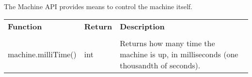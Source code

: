 The Machine API provides means to control the machine itself.

\begin{tabularx}{\textwidth}{l l X}
	\textbf{\large Function} & \textbf{\large Return} & \textbf{\large Description}
	\\ \\
	\endhead
	machine.milliTime() & int & Returns how many time the machine is up, in milliseconds (one thousandth of seconds).
\end{tabularx}